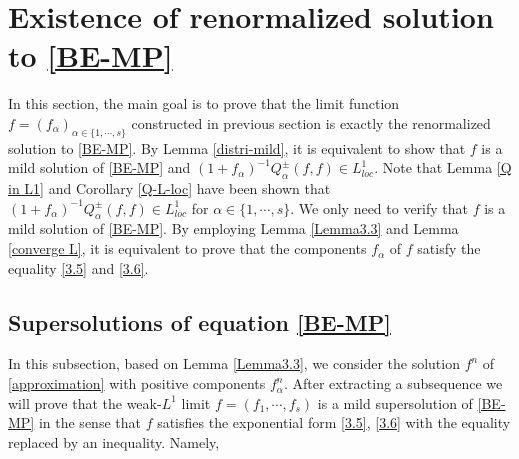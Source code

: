\documentclass[reqno,11pt]{amsart}
\numberwithin{equation}{section}
\begin{document}
\section{Existence of renormalized solution to \eqref{BE-MP}}\label{Sec:Ext}

In this section, the main goal is to prove that the limit function $f = (f_\alpha)_{ \alpha \in \{ 1, \cdots, s \} }$ constructed in previous section is exactly the renormalized solution to \eqref{BE-MP}. By Lemma \ref{distri-mild}, it is equivalent to show that $f$ is a mild solution of \eqref{BE-MP} and $(1 + f_\alpha)^{-1} Q^\pm_\alpha (f, f) \in L^1_{loc}$. Note that Lemma \ref{Q in L1} and Corollary \ref{Q-L-loc} have been shown that $(1 + f_\alpha)^{-1} Q^\pm_\alpha (f, f) \in L^1_{loc}$ for $\alpha \in \{ 1, \cdots, s \}$. We only need to verify that $f$ is a mild solution of \eqref{BE-MP}. By employing Lemma \ref{Lemma3.3} and Lemma \ref{converge L}, it is equivalent to prove that the components $f_\alpha$ of $f$ satisfy the equality \eqref{3.5} and \eqref{3.6}.


\subsection{Supersolutions of equation \eqref{BE-MP}}
In this subsection, based on Lemma \ref{Lemma3.3}, we consider the solution $f^n$ of \eqref{approximation} with positive components $f^n_\alpha$. After extracting a subsequence we will prove that the weak-$L^1$ limit $f=(f_1,\cdots,f_s)$ is a mild supersolution of \eqref{BE-MP} in the sense that $f$ satisfies the exponential form \eqref{3.5}, \eqref{3.6} with the equality replaced by an inequality. Namely,
\end{document}
